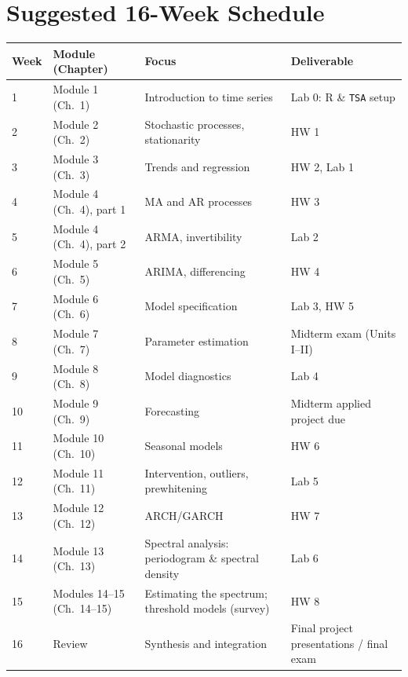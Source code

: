 \documentclass[11pt]{article}
\begin{document}
\section{Suggested 16-Week Schedule}
\begin{longtable}{@{}p{1.1cm}p{4.6cm}p{5.4cm}p{2.7cm}@{}}
\toprule
\textbf{Week} & \textbf{Module (Chapter)} & \textbf{Focus} & \textbf{Deliverable} \\
\midrule
\endhead
1 & Module 1 (Ch.\ 1) & Introduction to time series & Lab 0: R \& \texttt{TSA} setup \\
2 & Module 2 (Ch.\ 2) & Stochastic processes, stationarity & HW 1 \\
3 & Module 3 (Ch.\ 3) & Trends and regression & HW 2, Lab 1 \\
4 & Module 4 (Ch.\ 4), part 1 & MA and AR processes & HW 3 \\
5 & Module 4 (Ch.\ 4), part 2 & ARMA, invertibility & Lab 2 \\
6 & Module 5 (Ch.\ 5) & ARIMA, differencing & HW 4 \\
7 & Module 6 (Ch.\ 6) & Model specification & Lab 3, HW 5 \\
8 & Module 7 (Ch.\ 7) & Parameter estimation & Midterm exam (Units I--II) \\
9 & Module 8 (Ch.\ 8) & Model diagnostics & Lab 4 \\
10 & Module 9 (Ch.\ 9) & Forecasting & Midterm applied project due \\
11 & Module 10 (Ch.\ 10) & Seasonal models & HW 6 \\
12 & Module 11 (Ch.\ 11) & Intervention, outliers, prewhitening & Lab 5 \\
13 & Module 12 (Ch.\ 12) & ARCH/GARCH & HW 7 \\
14 & Module 13 (Ch.\ 13) & Spectral analysis: periodogram \& spectral density & Lab 6 \\
15 & Modules 14--15 (Ch.\ 14--15) & Estimating the spectrum; threshold models (survey) & HW 8 \\
16 & Review & Synthesis and integration & Final project presentations / final exam \\
\bottomrule
\end{longtable}

\newpage
\end{document}
